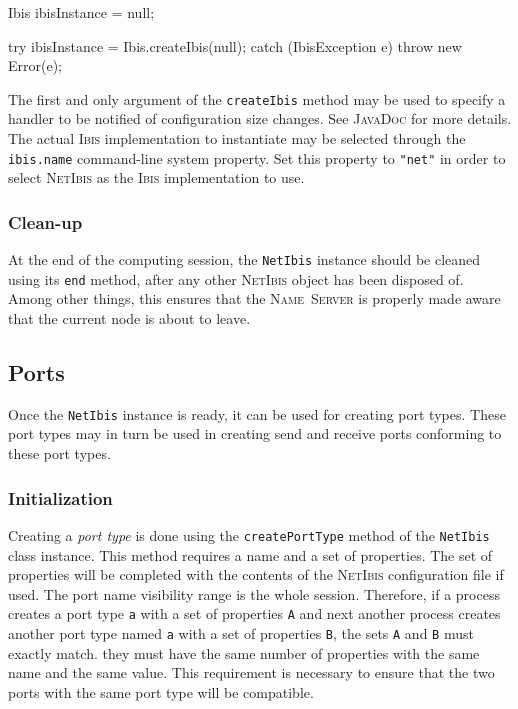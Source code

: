 \documentclass[11pt]{book}
\def\Ibis{\textsc{Ibis}\xspace}
\def\NetIbis{\textsc{NetIbis}\xspace}
\def\netibis{\texttt{NetIbis}\xspace}
\def\jd{\textsc{JavaDoc}\xspace}
\def\ins{\textsc{Name~Server}\xspace}
\begin{document}
\begin{Miniverb}

  Ibis ibisInstance = null;

  try {
    ibisInstance = Ibis.createIbis(null);
  } catch (IbisException e) {
    throw new Error(e);
  }

\end{Miniverb}

The first and only argument of the \texttt{createIbis} method may be
used to specify a handler to be notified of configuration size
changes. See \jd for more details. The actual \Ibis implementation to
instantiate may be selected through the \texttt{ibis.name}
command-line system property. Set this property to \texttt{"net"} in
order to select \NetIbis as the \Ibis implementation to use.

%
\subsubsection{Clean-up}
\label{sec:clean-up}

At the end of the computing session, the \netibis instance should be
cleaned using its \texttt{end} method, after any other \NetIbis object
has been disposed of. Among other things, this ensures that the \ins
is properly made aware that the current node is about to leave.

\subsection{Ports}
\label{sec:ports}

Once the \netibis instance is ready, it can be used for creating port
types. These port types may in turn be used in creating send and
receive ports conforming to these port types.

%
\subsubsection{Initialization}
\label{sec:initialization-2}

Creating a \emph{port type} is done using the \texttt{createPortType}
method of the \netibis class instance. This method requires a name and
a set of properties. The set of properties will be completed with the
contents of the \NetIbis configuration file if used. The port name
visibility range is the whole session. Therefore, if a process creates
a port type \texttt{a} with a set of properties \texttt{A} and next
another process creates another port type named \texttt{a} with a set
of properties \texttt{B}, the sets \texttt{A} and \texttt{B} must
exactly match. they must have the same number of properties with the
same name and the same value. This requirement is necessary to ensure
that the two ports with the same port type will be compatible.
\end{document}
